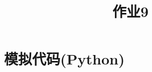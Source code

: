 \documentclass[cn]{homework}
\title{作业9}
\begin{document}
    \maketitle

    \appendix
    \section{模拟代码(Python)}
    
\end{document}
